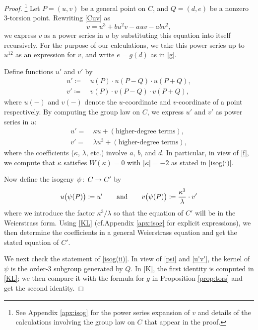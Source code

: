 \documentclass{gtpart}
\theoremstyle{definition}
\theoremstyle{remark}
\def\co{\colon\thinspace}
\newcommand{\cf}{cf.\thinspace}
\newcommand{\ad}{{\rm and}}
\newcommand{\K}{\kappa}
\begin{document}
\begin{proof}
 \footnote{See Appendix \ref{apx:isog} for the power series expansion of $v$ and details of the calculations involving the group law on $C$ that appear in the proof.  }
 Let $P = (u,v)$ be a general point on $C$, and $Q = (d,e)$ be a nonzero 3-torsion point.  
 Rewriting \eqref{Cuv} as 
 \[
  v = u^3 + b u^2 v - a u v - a b v^2, 
 \]
 we express $v$ as a power series in $u$ by substituting this equation into itself recursively.  
 For the purpose of our calculations, we take this power series up to $u^{12}$ as an expression for $v$, 
 and write $e = g(d)$ as in \eqref{g}.  

 Define functions $u'$ and $v'$ by 
 \begin{equation}
 \label{u'v'}
 \begin{split}
  u' \coloneqq & ~ u(P) \cdot u(P-Q) \cdot u(P+Q), \\
  v' \coloneqq & ~ v(P) \cdot v(P-Q) \cdot v(P+Q), 
 \end{split}
 \end{equation}
 where $u(-)$ and $v(-)$ denote the $u$-coordinate and $v$-coordinate of a point respectively.  
 By computing the group law on $C$, we express $u'$ and $v'$ as power series in $u$: 
 \begin{equation}
 \label{KL}
 \begin{split}
  u' = & ~ \K u + (\text{higher-degree terms}), \\
  v' = & ~ \lambda u^3 + (\text{higher-degree terms}), 
 \end{split}
 \end{equation}
 where the coefficients ($\K$, $\lambda$, etc.) involve $a$, $b$, and $d$.  
 In particular, in view of \eqref{f}, we compute that $\K$ satisfies $W(\K) = 0$ with $|\K| = -2$ as stated in \eqref{isog(i)}.  

 Now define the isogeny $\psi \co C \to C'$ by 
 \begin{equation}
 \label{psi}
  u\big( \psi(P) \big) \coloneqq u' \qquad \ad \qquad v\big( \psi(P) \big) \coloneqq \frac{\K^3}{\lambda} \cdot v' 
 \end{equation}
 where we introduce the factor $\K^3 / \lambda$ so that the equation of $C'$ will be in the Weierstrass form.  
 Using \eqref{KL} (\cf Appendix \ref{apx:isog} for explicit expressions), 
 we then determine the coefficients in a general Weierstrass equation and get the stated equation of $C'$.  

 We next check the statement of \eqref{isog(ii)}.  
 In view of \eqref{psi} and \eqref{u'v'}, the kernel of $\psi$ is the order-3 subgroup generated by $Q$.  
 In \eqref{K}, the first identity is computed in \eqref{KL}; 
 we then compare it with the formula for $g$ in Proposition \ref{prop:tors} and get the second identity.  


\end{proof}
\end{document}
